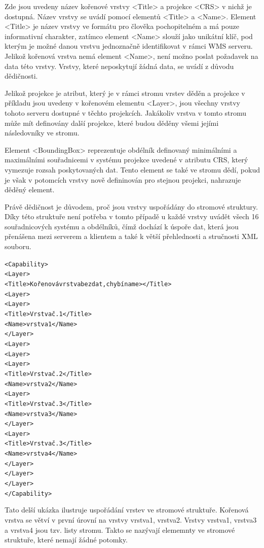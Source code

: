 \documentclass[a4paper,12pt]{article}
\begin{document}
Zde jsou uvedeny název kořenové vrstvy <Title> a projekce <CRS> v nichž je dostupná. Název vrstvy se uvádí pomocí elementů <Title> a <Name>. Element
<Title> je název vrstvy ve formátu pro člověka pochopitelném a má pouze informativní charakter, zatímco element <Name> slouží jako unikátní klíč, 
pod kterým je možné danou vrstvu jednoznačně identifikovat v rámci WMS serveru. Jelikož kořenová vrstva nemá element <Name>, není možno poslat požadavek na data této vrstvy. Vrstvy, které neposkytují 
žádná data, se uvádí z důvodu dědičnosti. 

Jelikož projekce je atribut, který je v rámci stromu vrstev děděn a projekce v příkladu jsou uvedeny v kořenovém elementu <Layer>, jsou všechny vrstvy tohoto serveru dostupné v těchto projekcích.
Jakákoliv vrstva v tomto stromu může mít definovány další projekce, které budou děděny všemi jejími následovníky ve stromu. 

Element <BoundingBox> reprezentuje obdélník definovaný minimálními a maximálními souřadnicemi v systému projekce uvedené v atributu CRS, který vymezuje rozsah poskytovaných dat. 
Tento element se také ve stromu dědí, pokud je však v potomcích vrstvy nově defininován pro stejnou projekci, nahrazuje děděný element.

 Právě dědičnost je důvodem, proč jsou vrstvy uspořádány do stromové struktury. Díky této struktuře není potřeba v tomto případě u každé vrstvy
uvádět všech 16 souřadnicových systému a obdélníků, čímž dochází k úspoře dat, která jsou přenášena mezi serverem a klientem a také k větší přehlednosti a stručnosti XML souboru.

\newpage

\begin{alltt}\footnotesize
<Capability>
  <Layer>
    <Title>Kořenová vrstva bez dat, chybí name></Title>
    <Layer>
      <Layer>
        <Title>Vrstva č. 1</Title>
        <Name>vrstva1</Name>
      </Layer>
    <Layer>
    <Layer>
      <Layer>
        <Title>Vrstva č. 2</Title>
        <Name>vrstva2</Name>
        <Layer>
          <Title>Vrstva č. 3</Title>
          <Name>vrstva3</Name>
        </Layer>
        <Layer>
          <Title>Vrstva č. 3</Title>
          <Name>vrstva4</Name>
        </Layer>
      </Layer>
    </Layer>
</Capability>
\end{alltt}



Tato delší ukázka ilustruje uspořádání vrstev ve stromové struktuře. Kořenová vrstva se větví v první úrovní  na vrstvy vrstva1, 
vrstva2. Vrstvy vrstva1, vrstva3 a vrstva4 jsou tzv. listy stromu. Takto se nazývají elememnty ve stromové struktuře, které nemají 
žádné potomky. 
\end{document}
